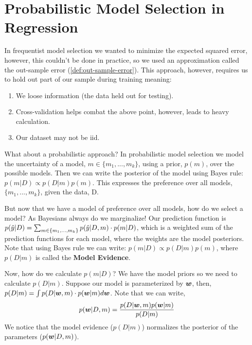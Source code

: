 \section{Probabilistic Model Selection in Regression}
In frequentist model selection we wanted to minimize the expected squared error, however, this couldn't be done in practice, so we used an approximation called the out-sample error (\cref{def:out-sample-error}). This approach, however, requires us to hold out part of our sample during training meaning:
\begin{enumerate}
    \item We loose information (the data held out for testing).
    \item Cross-validation helps combat the above point, however, leads to heavy calculation.
    \item Our dataset may not be iid.
\end{enumerate}
What about a probabilistic approach? In probabilistic model selection we model the uncertainty of a model, $m\in \{m_{1},...,m_{k}\}$, using a prior, $p(m)$, over the possible models. Then we can write the posterior of the model using Bayes rule: $p(m|D) \propto p(D|m) p(m)$. This expresses the preference over all models, $\{m_{1},...,m_{k}\}$, given the data, D. 

But now that we have a model of preference over all models, how do we select a model? As Bayesians always do we marginalize! Our prediction function is $p(\hat{y} | D) = \sum_{m \in \{m_{1},...,m_{k}\}} p(\hat{y} | D,m) \cdot p(m|D)$, which is a weighted sum of the prediction functions for each model, where the weights are the model posteriors. Note that using Bayes rule we can write: $p(m|D) \propto p(D|m) p(m)$, where $p(D|m)$ is called the \textbf{Model Evidence}. 

Now, how do we calculate $p(m|D)$? We have the model priors so we need to calculate $p(D|m)$. Suppose our model is parameterized by $\bm{w}$, then, $p(D|m) = \int p(D|\bm{w},m) \cdot p(\bm{w}|m) d\bm{w}$. Note that we can write,
\begin{equation}
    p(\bm{w} |D,m) = \frac{p(D|\bm{w},m) p(\bm{w}|m)}{p(D|m)}
\end{equation}
We notice that the model evidence ($p(D|m)$) normalizes the posterior of the parameters ($p(\bm{w} |D,m)$).


